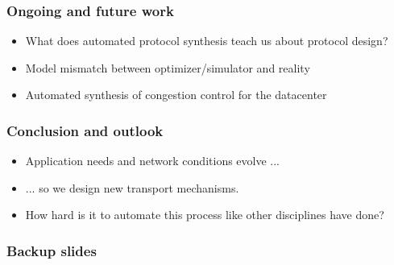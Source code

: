 \documentclass[svgnames]{beamer}
\begin{document}
\begin{Large}
\begin{frame}
\frametitle{Ongoing and future work}
\begin{itemize}
\item<1-> What does automated protocol synthesis teach us about protocol design?
\item<2-> Model mismatch between optimizer/simulator and reality
\item<3-> Automated synthesis of congestion control for the datacenter
\end{itemize}
\end{frame}

\begin{frame}
\frametitle{Conclusion and outlook}
\begin{itemize}
\item<1-> Application needs and network conditions evolve ...
\item<2-> ... so we design new transport mechanisms.
\item<3-> How hard is it to automate this process like other disciplines have done?
\end{itemize}
\end{frame}

\end{Large}

\begin{frame}
\frametitle{Backup slides}
\end{frame}


\end{document}
